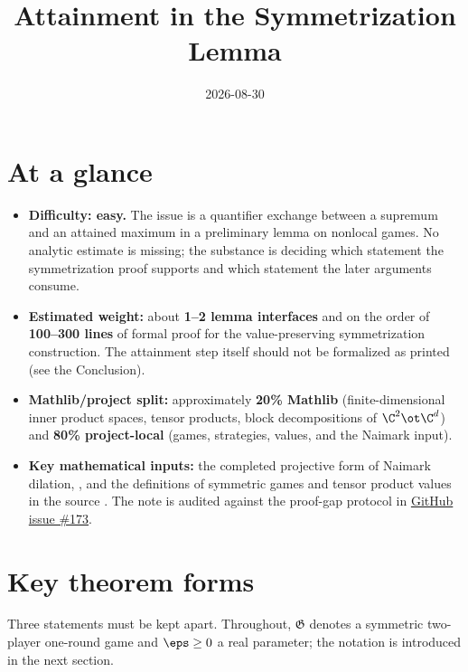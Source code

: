 \documentclass[11pt]{article}
\title{Attainment in the Symmetrization Lemma}
\author{}
\date{2026-08-30}
\newcommand{\game}{\mathfrak{G}}
\renewcommand{\ghissue}[1]{%
  \href{https://github.com/Dengnifer/MIPStarRE-A/issues/#1}{GitHub issue \##1}}
\begin{document}
\maketitle

\section{At a glance}

\begin{itemize}
  \item \textbf{Difficulty: easy.}  The issue is a quantifier exchange between
  a supremum and an attained maximum in a preliminary lemma on nonlocal games.
  No analytic estimate is missing; the substance is deciding which statement
  the symmetrization proof supports and which statement the later arguments
  consume.
  \item \textbf{Estimated weight:} about \textbf{1--2 lemma interfaces} and on
  the order of \textbf{100--300 lines} of formal proof for the value-preserving
  symmetrization construction.  The attainment step itself should not be
  formalized as printed (see the Conclusion).
  \item \textbf{Mathlib/project split:} approximately \textbf{20\% Mathlib}
  (finite-dimensional inner product spaces, tensor products, block
  decompositions of $\C^2 \ot \C^d$) and \textbf{80\% project-local} (games,
  strategies, values, and the Naimark input).
  \item \textbf{Key mathematical inputs:} the completed projective form of
  Naimark dilation, \cite[Theorem~5.1]{Ji2020LowIndividualDegree}, and the
  definitions of symmetric games and tensor product values in the source
  \cite[Section~5]{Ji2020MIPStar}.  The note is audited against the
  proof-gap protocol in \ghissue{173}.
\end{itemize}

\section{Key theorem forms}

Three statements must be kept apart.  Throughout, $\game$ denotes a symmetric
two-player one-round game and $\eps \ge 0$ a real parameter; the notation is
introduced in the next section.
\end{document}
